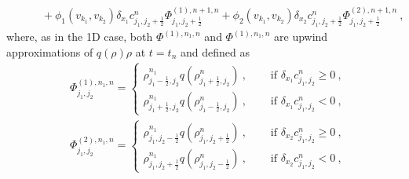 \documentclass{article}
\begin{document}
{\begin{align*}
    & \qquad  + \phi_{1}(v_{k_1}, v_{k_2})\delta_{x_1} c_{j_1,j_2+\frac12}^n\Phi^{(1),n+1,n}_{j_1,j_2+\frac12} +\phi_{2}(v_{k_1}, v_{k_2}) \delta_{x_2} c_{j_1,j_2+\frac12}^n 
    \Phi^{(2),n+1,n}_{j_1,j_2+\frac12}
    \ ,
\end{align*}
where, as in the 1D case, both $\Phi^{(1), n_1,n}$ and $\Phi^{(1), n_1,n}$ are upwind approximations of $q(\rho)\rho$ at $t=t_n$ and defined as 
\begin{align*}
    & \Phi^{(1), n_1,n}_{j_1, j_2} = 
	\begin{cases}
		\rho_{j_1 - \frac12,j_2}^{n_1} q(\rho_{j_1+\frac12,j_2}^n)\ , \quad & \text{ if } \delta_{x_1} c_{j_1,j_2}^n \ge 0\ , \\
		\rho_{j_1+\frac12,j_2}^{n_1} q(\rho_{j_1-\frac12,j_2}^n)\ , \quad & \text{ if } \delta_{x_1} c_{j_1,j_2}^n <0\ , 
	\end{cases}\\
	& \Phi^{(2), n_1,n}_{j_1, j_2} = 
	\begin{cases}
		\rho_{j_1,j_2 - \frac12}^{n_1} q(\rho_{j_1,j_2+\frac12}^n)\ , \quad & \text{ if } \delta_{x_2} c_{j_1,j_2}^n \ge 0\ , \\
		\rho_{j_1,j_2+\frac12}^{n_1} q(\rho_{j_1,j_2-\frac12}^n)\ , \quad & \text{ if } \delta_{x_2} c_{j_1,j_2}^n <0\ ,
	\end{cases}
\end{align*}

}
\end{document}
